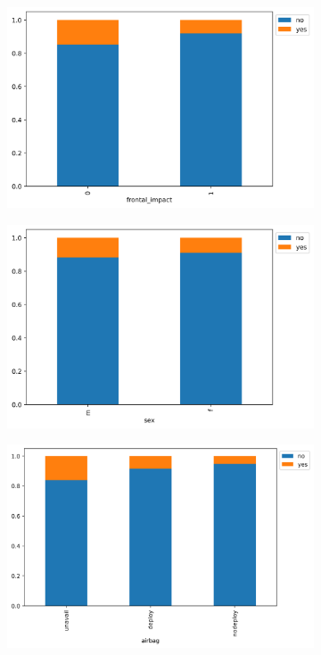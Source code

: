 \documentclass[12pt,a4paper]{article}
\begin{document}
\begin{figure}[h]
	\hfill
	\begin{subfigure}[t]{0.32\textwidth}
		\centering
		\includegraphics[width=\textwidth]{fontal_impact_stack_deceased.png}
		\caption{}
		\label{fig:fontal_impact_stack_deceased}
	\end{subfigure}
	\hfill
	\begin{subfigure}[t]{0.32\textwidth}
		\centering
		\includegraphics[width=\textwidth]{sex_stack_deceaed.png}
		\caption{}
		\label{fig:sex_stack_deceaed}
	\end{subfigure}
	\hfill
	\begin{subfigure}[t]{0.32\textwidth}
		\centering
		\includegraphics[width=\textwidth]{airbag_stack_deceased.png}

\end{subfigure}
\end{figure}
\end{document}
